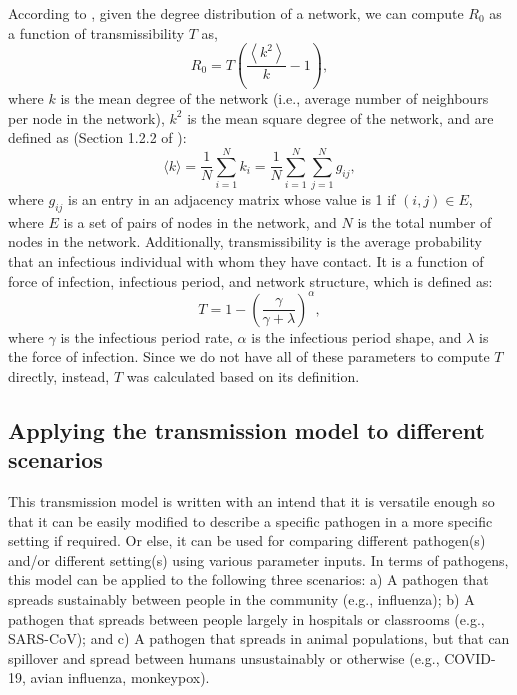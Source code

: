 \documentclass[a4paper]{article}
\begin{document}
	According to \cite{Meyers2005JTheoBiol}, given the degree distribution of a network, we can compute $R_0$ as a function of transmissibility $T$ as,
	\begin{equation}
	R_0 = T\left (\frac{\left \langle k^2 \right \rangle}{k}-1\right),
	\end{equation}
	where $k$ is the mean degree of the network (i.e., average number of neighbours per node in the network), $k^2$ is the mean square degree of the network, and are defined as (Section 1.2.2 of \cite{Kiss2017}):
	\begin{equation}\label{equ: degree}
	\langle k\rangle = \frac{1}{N}\sum_{i=1}^{N}k_i=\frac{1}{N}\sum_{i=1}^{N}\sum_{j=1}^{N}g_{ij},
	\end{equation}
	where $g_{ij}$ is an entry in an adjacency matrix whose value is 1 if $(i,j) \in E$, where $E$ is a set of pairs of nodes in the network, and $N$ is the total number of nodes in the network. Additionally, transmissibility is the average probability that an infectious individual with whom they have contact. It is a function of force of infection, infectious period, and network structure, which is defined as\cite{Kahn2018ClinTrials}:
	\begin{equation}\label{equ: transmissibility}
	T = 1-\left(\frac{\gamma}{\gamma+\lambda}\right)^\alpha,
	\end{equation}
	where $\gamma$ is the infectious period rate, $\alpha$ is the infectious period shape, and $\lambda$ is the force of infection. Since we do not have all of these parameters to compute $T$ directly, instead, $T$ was calculated based on its definition.
	
	\subsection{Applying the transmission model to different scenarios}
	\label{sec:Example}
	This transmission model is written with an intend that it is versatile enough so that it can be easily modified to describe a specific pathogen in a more specific setting if required. Or else, it can be used for comparing different pathogen(s) and/or different setting(s) using various parameter inputs. In terms of pathogens, this model can be applied to the following three scenarios: a) A pathogen that spreads sustainably between people in the community (e.g., influenza); b) A pathogen that spreads between people largely in hospitals or classrooms (e.g., SARS-CoV); and c) A pathogen that spreads in animal populations, but that can spillover and spread between humans unsustainably or otherwise (e.g., COVID-19, avian influenza, monkeypox). 
	
\end{document}
